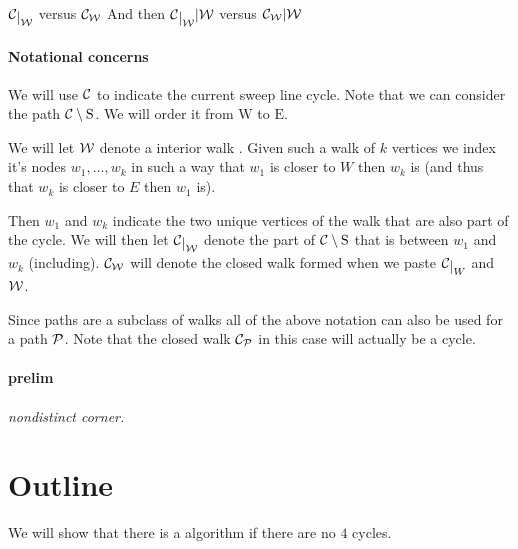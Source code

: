 

\newcommand\restrict[1]{\raisebox{-.5ex}{$|$}_{#1}}


\maketitle


\newcommand{\W}{\scr W}
\renewcommand{\P}{\scr P}
\newcommand{\restC}[1]{\ensuremath{\C\restrict{#1}}}

\newcommand{\mrN}{\mathrm{N}}
\newcommand{\mrS}{\mathrm{S}}
\newcommand{\mrE}{\mathrm{E}}
\newcommand{\mrW}{\mathrm{W}}

\newcommand{\cpath}{\C \setminus \braces{\mrS}} %


\restC{\W} versus $\C_\W$ And then $\restC{\W} | \W$ versus $\C_\W|\W$

\paragraph{Notational concerns}
We will use $\mathcal{C}$ to indicate the current sweep line cycle. 
Note that we can consider the path $\mathcal{C} \setminus {\mathrm{S}}$. We will order it from $\mrW$ to $\mrE$. 

We will let $\W$ denote a interior walk  . Given such a walk of $k$ vertices we index it's nodes $w_1, \ldots, w_k$  in such a way that $w_1$ is closer to $W$ then $w_k$ is (and thus that $w_k$ is closer to $E$ then $w_1$ is). 

Then $w_1$ and $w_k$ indicate the two unique vertices of the walk that are also part of the cycle. We will then let $\restC{\W}$ denote the part of $\mathcal{C}\setminus {\mathrm{S}}$ that is between $w_1$ and $w_k$ (including). $\C_\W$ will denote the closed walk formed when we paste $\restC{W}$ and $\W$.

Since paths are a subclass of walks all of the above notation can also be used for a path $\P$. Note that the closed walk $\C_\P$ in this case will actually be a cycle.


\paragraph{prelim}
\emph{nondistinct corner.}

\section{Outline}
We will show that there is a algorithm if there are no $4$ cycles.

